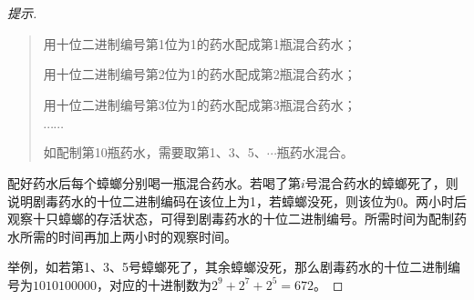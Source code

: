 \begin{proof}[提示]
\begin{quotation}
    用十位二进制编号第1位为1的药水配成第1瓶混合药水；

    用十位二进制编号第2位为1的药水配成第2瓶混合药水；

    用十位二进制编号第3位为1的药水配成第3瓶混合药水；
    
    $\cdots\cdots$

    如配制第10瓶药水，需要取第1、3、5、$\cdots$瓶药水混合。
  \end{quotation}

    配好药水后每个蟑螂分别喝一瓶混合药水。若喝了第$i$号混合药水的蟑螂死了，则说明剧毒药水的十位二进制编码在该位上为1，若蟑螂没死，则该位为0。两小时后观察十只蟑螂的存活状态，可得到剧毒药水的十位二进制编号。所需时间为配制药水所需的时间再加上两小时的观察时间。

    举例，如若第1、3、5号蟑螂死了，其余蟑螂没死，那么剧毒药水的十位二进制编号为$1010100000$，对应的十进制数为$2^9 + 2^7 + 2^5=672$。
\end{proof}